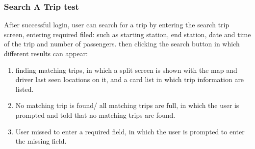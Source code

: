\documentclass[a4paper, 12pt]{report} %
\begin{document}
            \subsubsection{Search A Trip test}
                After successful login, user can search for a trip by entering the search trip screen, entering required filed: such as starting station, end station, date and time of the trip and number of passengers.
                then clicking the search button in which different results can appear:
                \begin{enumerate}
                    \item finding matching trips, in which a split screen is shown with the map and driver last seen locations on it, and a card list in which trip information are listed.
                    \item No matching trip is found/ all matching trips are full, in which the user is prompted and told that no matching trips are found.
                    \item User missed to enter a required field, in which the user is prompted to enter the missing field.
                \end{enumerate}

                \pagebreak
\end{document}
